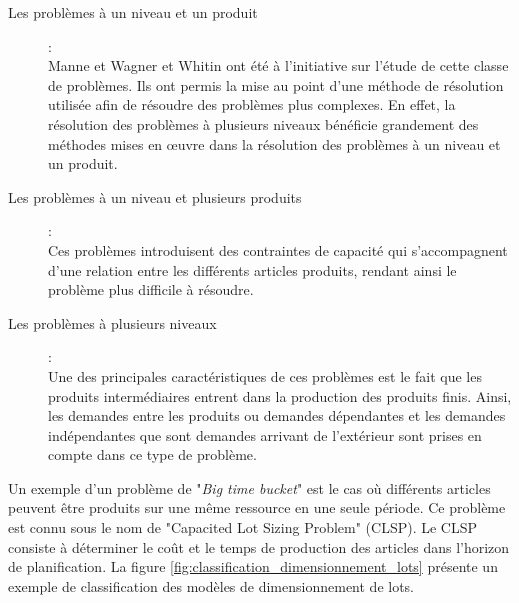 	\begin{description}
		\item[Les problèmes à un niveau et un produit]: \\
		Manne \cite{manne} et Wagner et Whitin \cite{wagner_whitin} ont été à l'initiative sur l'étude de cette classe de problèmes. Ils ont permis la mise au point d'une méthode de résolution utilisée afin de résoudre des problèmes plus complexes. En effet, la résolution des problèmes à plusieurs niveaux bénéficie grandement des méthodes mises en œuvre dans la résolution des problèmes à un niveau et un produit.
				
		\item[Les problèmes à un niveau et plusieurs produits]: \\
		Ces problèmes introduisent des contraintes de capacité qui s'accompagnent d'une relation entre les différents articles produits, rendant ainsi le problème plus difficile à résoudre.
		
		\item[Les problèmes à plusieurs niveaux]: \\ 
		Une des principales caractéristiques de ces problèmes est le fait que les produits intermédiaires entrent dans la production des produits finis. Ainsi, les demandes entre les produits ou demandes dépendantes et les demandes indépendantes que sont demandes arrivant de l'extérieur sont prises en compte dans ce type de problème.
		
	\end{description}
	
	Un exemple d'un problème de "\emph{Big time bucket}" est le cas où différents articles peuvent être produits sur une même ressource en une seule période. Ce problème est connu sous le nom de "Capacited Lot Sizing Problem" (CLSP). Le CLSP consiste à déterminer le coût et le temps de production des articles dans l'horizon de planification. La figure \ref{fig:classification_dimensionnement_lots} présente un exemple de classification des modèles de dimensionnement de lots.
	
